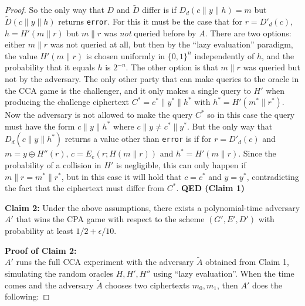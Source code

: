 \begin{proof}
So the only way that \(D\) and \(\tilde{D}\) differ is if
\(D_d(c\|y\|h)=m\) but \(\tilde{D}(c\|y\|h)\) returns \texttt{error}.
For this it must be the case that for \(r=D'_d(c)\), \(h=H'(m\|r)\) but
\(m\|r\) was \emph{not} queried before by \(A\). There are two options:
either \(m\|r\) was not queried at all, but then by the ``lazy
evaluation'' paradigm, the value \(H'(m\|r)\) is chosen uniformly in
\(\{0,1\}^n\) independently of \(h\), and the probability that it equals
\(h\) is \(2^{-n}\). The other option is that \(m\|r\) was queried but
not by the adversary. The only other party that can make queries to the
oracle in the CCA game is the challenger, and it only makes a single
query to \(H'\) when producing the challenge ciphertext
\(C^* = c^*\|y^*\|h^*\) with \(h^* = H'(m^*\|r^*)\). Now the adversary
is not allowed to make the query \(C^*\) so in this case the query must
have the form \(c\|y\|h^*\) where \(c\|y \neq c^*\|y^*\). But the only
way that \(D_d(c\|y\|h^*)\) returns a value other than \texttt{error} is
if for \(r=D'_d(c)\) and \(m = y \oplus H''(r)\), \(c=E_e(r;H(m\|r))\)
and \(h^* = H'(m\|r)\). Since the probability of a collision in \(H'\)
is negligible, this can only happen if \(m\|r = m^*\|r^*\), but in this
case it will hold that \(c=c^*\) and \(y=y^*\), contradicting the fact
that the ciphertext must differ from \(C^*\). \textbf{QED (Claim 1)}

\textbf{Claim 2:} Under the above assumptions, there exists a
polynomial-time adversary \(A'\) that wins the CPA game with respect to
the scheme \((G',E',D')\) with probability at least
\(1/2 + \epsilon/10\).

\textbf{Proof of Claim 2:}\\
\(A'\) runs the full CCA experiment with the adversary \(\tilde{A}\)
obtained from Claim 1, simulating the random oracles \(H,H',H''\) using
``lazy evaluation''. When the time comes and the adversary \(\tilde{A}\)
chooses two ciphertexts \(m_0,m_1\), then \(A'\) does the following:


\end{proof}
